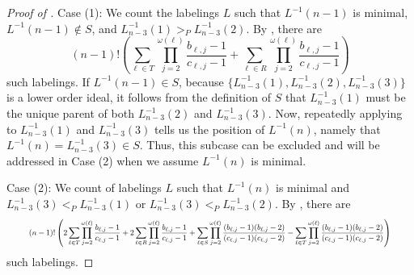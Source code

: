 \documentclass[11pt]{amsart}
\theoremstyle{definition}
\newcommand{\inverse}{^{-1}}
\begin{document}
\begin{proof}[Proof of ]
	Case (1): We count the labelings $ L $ such that $ L\inverse(n-1) $ is minimal, $ L\inverse(n-1)\not\in S $, and $ L_{n-3}\inverse(1)>_PL_{n-3}\inverse(2) $. By , there are \begin{equation}\label{eq: L(n-1)}
		(n-1)!\left(\sum_{\ell\in T}\prod_{j=2}^{\omega(\ell)}\frac{b_{\ell,j}-1}{c_{\ell,j}-1}+\sum_{\ell\in R}\prod_{j=2}^{\omega(\ell)}\frac{b_{\ell,j}-1}{c_{\ell,j}-1}\right)
	\end{equation} such labelings. If $ L\inverse(n-1)\in S $, because $ \{L_{n-3}\inverse(1),L_{n-3}\inverse(2),L_{n-3}\inverse(3)\} $ is a lower order ideal, it follows from the definition of $ S $ that $ L_{n-3}\inverse(1) $ must be the unique parent of both $ L_{n-3}\inverse(2) $ and $ L_{n-3}\inverse(3) $. Now, repeatedly applying  to $ L_{n-3}\inverse(1) $ and $ L_{n-3}\inverse(3) $ tells us the position of $ L\inverse(n) $, namely that $ L\inverse(n)=L_{n-3}\inverse(3)\in S $. Thus, this subcase can be excluded and will be addressed in Case (2) when we assume $ L\inverse(n) $ is minimal. 
	
	Case (2): We count of labelings $ L $ such that $ L\inverse(n) $ is minimal and $ L_{n-3}\inverse(3)<_PL_{n-3}\inverse(1) $ or $ L_{n-3}\inverse(3)<_PL_{n-3}\inverse(2) $. By , there are \begin{equation}\label{eq: L(n)}
		\resizebox{.94 \textwidth}{!} 
		{
			$(n-1)!\left(2\displaystyle\sum_{\ell\in T}\prod_{j=2}^{\omega(\ell)}\frac{b_{\ell,j}-1}{c_{\ell,j}-1}+2\sum_{\ell\in R}\prod_{j=2}^{\omega(\ell)}\frac{b_{\ell,j}-1}{c_{\ell,j}-1}\\
			+\sum_{\ell\in S}\prod_{j=2}^{\omega(\ell)}\frac{(b_{\ell,j}-1)(b_{\ell,j}-2)}{(c_{\ell,j}-1)(c_{\ell,j}-2)}-\sum_{\ell\in T}\prod_{j=2}^{\omega(\ell)}\frac{(b_{\ell,j}-1)(b_{\ell,j}-2)}{(c_{\ell,j}-1)(c_{\ell,j}-2)}\right)$
		}
	\end{equation} such labelings.
	

\end{proof}
\end{document}
